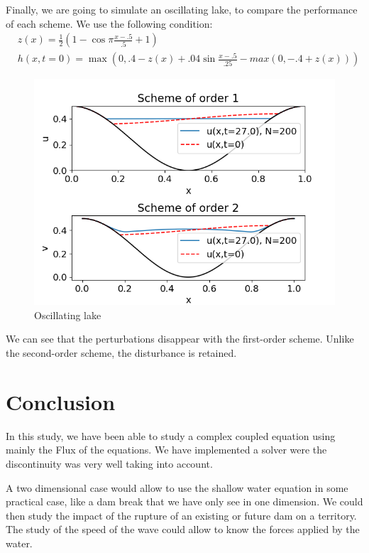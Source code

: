             Finally, we are going to simulate an oscillating lake, to compare the performance of each scheme. We use the following condition:
            \begin{align*}
                &z(x) = \frac{1}{2}\left( 1 - \cos{\pi\frac{x-.5}{.5}+1}  \right)\\
                &h(x,t=0) = \max(0, .4 - z(x) + .04\sin{\frac{x - .5}{.25}} - max(0, -.4 + z(x)))
            \end{align*}
            \begin{figure}[H]
                    \centering
                    \includegraphics[width= 12cm]{LFSV/L2lake.png}
                    \caption{Oscillating lake}
                    \label{fig:asci}
                \end{figure}
            
            We can see that the perturbations disappear with the first-order scheme. Unlike the second-order scheme, the disturbance is retained.
            
        \newpage
        
        \section{Conclusion}
            
            In this study, we have been able to study a complex coupled equation using mainly the Flux of the equations. We have implemented a solver were the discontinuity was very well taking into account. 
            
            A two dimensional case would allow to use the shallow water equation in some practical case, like a dam break that we have only see in one dimension. We could then study the impact of the rupture of an existing or future dam on a territory. The study of the speed of the wave could allow to know the forces applied by the water.
            
